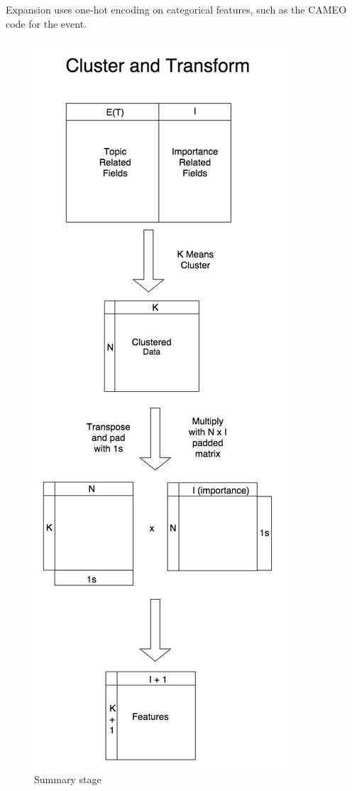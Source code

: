Expansion uses one-hot encoding on categorical features, such as the CAMEO code for the event.


\begin{figure}[ht]
\vskip 0.2in
\begin{center}
\centerline{\includegraphics[scale=0.15]{images/cluster_and_transform_vertical.png}}
\caption{Summary stage}
\end{center}
\vskip -0.2in
\label{fig:summarization}
\end{figure}

